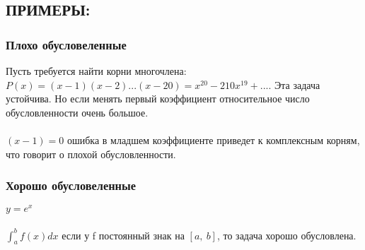 \documentclass[16pt]{article}
\begin{document}
			\subsection{ПРИМЕРЫ:}
			\subsubsection{Плохо обусловеленные}
			Пусть требуется найти корни многочлена:\\
			$P(x) = (x-1)(x-2)...(x-20)=x^{20} - 210 x^{19} + ... $. Эта задача устойчива. Но если менять первый коэффициент относительное число обусловленности очень большое.\\ \\
			$(x-1)=0$ ошибка в младшем коэффициенте приведет к комплексным корням, что говорит о плохой обусловленности.
			\subsubsection{Хорошо обусловеленные}
			$y = e^x$\\ \\
			$\int_{a}^{b}f(x) dx$ если у f постоянный знак на $[a,\ b]$, то задача хорошо обусловлена. 
\end{document}
